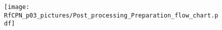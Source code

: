 \begin{figure}[ht]%
\begin{FigShortbox}[valign=top]%
\texttt{[image: RfCPN\_p03\_pictures/Post\_processing\_Preparation\_flow\_chart.pdf]}%
\setlength{\abovecaptionskip}{10pt}%
%
\end{FigShortbox}%
\end{figure}%

